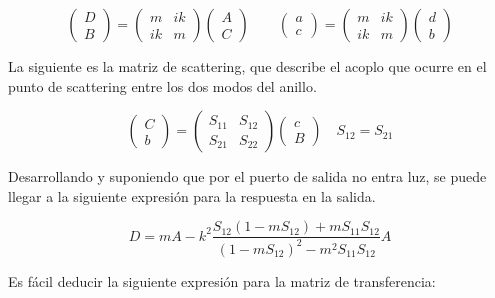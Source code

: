 \documentclass[oneside]{article}
\begin{document}
\begin{equation*}
   \begin{pmatrix}
   D \\
   B 
   \end{pmatrix}
   =
   \begin{pmatrix}
      m & ik  \\
      ik & m
   \end{pmatrix}
   \begin{pmatrix}
   A \\
   C 
   \end{pmatrix}
   \qquad
   \begin{pmatrix}
   a \\
   c 
   \end{pmatrix}
   =
   \begin{pmatrix}
      m & ik  \\
      ik & m
   \end{pmatrix}
   \begin{pmatrix}
   d \\
   b 
   \end{pmatrix}
\end{equation*}

La siguiente es la matriz de scattering, que describe el acoplo que ocurre en
el punto de scattering entre los dos modos del anillo.

\begin{equation*}
   \begin{pmatrix}
   C \\
   b 
   \end{pmatrix}
   =
   \begin{pmatrix}
      S_{11} & S_{12}  \\
      S_{21} & S_{22}
   \end{pmatrix}
   \begin{pmatrix}
   c \\
   B 
   \end{pmatrix}
   \quad
   S_{12}=S_{21}
\end{equation*}

Desarrollando y suponiendo que por el puerto de salida no entra luz, se puede
llegar a la siguiente expresión para la respuesta en la salida.

\begin{equation*}
   D = mA -k^{2}\frac{S_{12}(1-mS_{12}) + mS_{11}S_{12}}{(1-mS_{12})^2 - m^2S_{11}S_{12}}A
\end{equation*}
   
Es fácil deducir la siguiente expresión para la matriz de transferencia:
\end{document}
